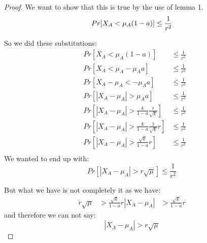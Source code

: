 \begin{proof}
    We want to show that this is true by the use of lemma 1.
    \begin{equation*}
        Pr[X_A < \mu_A(1-a)] \le \frac{1}{r^2}\\
    \end{equation*}

    So we did these substitutions:
    \begin{align*}
        &Pr[X_A < \mu_A(1-a)] &\le \frac{1}{r^2}\\
        &Pr[X_A < \mu_A - \mu_A a] &\le \frac{1}{r^2}\\
        &Pr[X_A - \mu_A < - \mu_A a] &\le \frac{1}{r^2}\\
        &Pr[|X_A - \mu_A| > \mu_A a] &\le \frac{1}{r^2}\\
        &Pr[|X_A - \mu_A| > \frac{k}{1-a} \frac{r}{\sqrt{k}}]   &\le \frac{1}{r^2}\\
        &Pr[|X_A - \mu_A| > \frac{k}{1-a} \frac{1}{\sqrt{k}} r] &\le \frac{1}{r^2}\\
        &Pr[|X_A - \mu_A| > \frac{\sqrt{k}}{1-a} r]&\le \frac{1}{r^2}\\
    \end{align*}
    We wanted to end up with:
    \begin{equation*}
        Pr[|X_A - \mu_A| > r \sqrt{\mu}] \le \frac{1}{r^2}
    \end{equation*}

    But what we have is not completely it as we have:
    \begin{align*}
        r \sqrt{\mu} &> \frac{\sqrt{k}}{1-a} r
        |X_A - \mu_A| &> \frac{\sqrt{k}}{1-a} r
    \end{align*}
    and therefore we can not say:
    \begin{equation*}
        |X_A - \mu_A| > r \sqrt{\mu}
    \end{equation*}


\end{proof}
